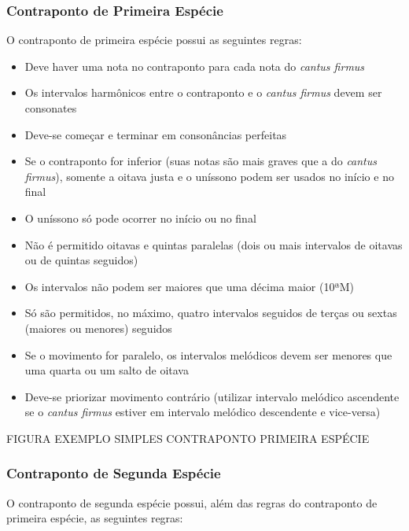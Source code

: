       \subsubsection[Contraponto de Primeira Espécie]{Contraponto de Primeira Espécie}

        O contraponto de primeira espécie possui as seguintes regras:

        \begin{itemize}
          \item Deve haver uma nota no contraponto para cada nota do \textit{cantus firmus}
          \item Os intervalos harmônicos entre o contraponto e o \textit{cantus firmus} devem ser consonates
          \item Deve-se começar e terminar em consonâncias perfeitas
          \item Se o contraponto for inferior (suas notas são mais graves que a do \textit{cantus firmus}), somente a oitava justa e o uníssono podem ser usados no início e no final
          \item O uníssono só pode ocorrer no início ou no final
          \item Não é permitido oitavas e quintas paralelas (dois ou mais intervalos de oitavas ou de quintas seguidos)
          \item Os intervalos não podem ser maiores que uma décima maior (10ªM)
          \item Só são permitidos, no máximo, quatro intervalos seguidos de terças ou sextas (maiores ou menores) seguidos
          \item Se o movimento for paralelo, os intervalos melódicos devem ser menores que uma quarta ou um salto de oitava
          \item Deve-se priorizar movimento contrário (utilizar intervalo melódico ascendente se o \textit{cantus firmus} estiver em intervalo melódico descendente e vice-versa)
        \end{itemize}

        FIGURA EXEMPLO SIMPLES CONTRAPONTO PRIMEIRA ESPÉCIE

      \subsubsection[Contraponto de Segunda Espécie]{Contraponto de Segunda Espécie}

        O contraponto de segunda espécie possui, além das regras do contraponto de primeira espécie, as seguintes regras:

